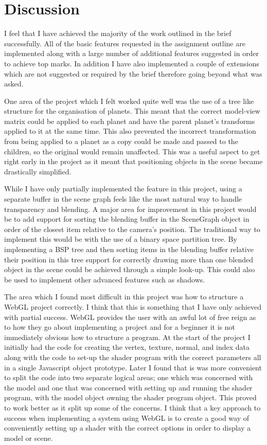 \documentclass[conference]{IEEEtran}
\begin{document}
\section{Discussion}
\label{sec:discussion}
I feel that I have achieved the majority of the work outlined in the brief successfully. All of the basic features requested in the assignment outline are implemented along with a large number of additional features suggested in order to achieve top marks. In addition I have also implemented a couple of extensions which are not suggested or required by the brief therefore going beyond what was asked.

One area of the project which I felt worked quite well was the use of a tree like structure for the organisation of planets. This meant that the correct model-view matrix could be applied to each planet and have the parent planet's transforms applied to it at the same time. This also prevented the incorrect transformation from being applied to a planet as a copy could be made and passed to the children, so the original would remain unaffected. This was a useful aspect to get right early in the project as it meant that positioning objects in the scene became drastically simplified.

While I have only partially implemented the feature in this project, using a separate buffer in the scene graph feels like the most natural way to handle transparency and blending. A major area for improvement in this project would be to add support for sorting the blending buffer in the SceneGraph object in order of the closest item relative to the camera's position. The traditional way to implement this would be with the use of a binary space partition tree. By implementing a BSP tree and then sorting items in the blending buffer relative their position in this tree support for correctly drawing more than one blended object in the scene could be achieved through a simple look-up. This could also be used to implement other advanced features such as shadows.

The area which I found most difficult in this project was how to structure a WebGL project correctly. I think that this is something that I have only achieved with partial success. WebGL provides the user with an awful lot of free reign as to how they go about implementing a project and for a beginner it is not immediately obvious how to structure a program. At the start of the project I initially had the code for creating the vertex, texture, normal, and index data along with the code to set-up the shader program with the correct parameters all in a single Javascript object prototype. Later I found that is was more convenient to split the code into two separate logical areas; one which was concerned with the model and one that was concerned with setting up and running the shader program, with the model object owning the shader program object. This proved to work better as it split up some of the concerns. I think that a key approach to success when implementing a system using WebGL is to create a good way of conveniently setting up a shader with the correct options in order to display a model or scene.
\end{document}
